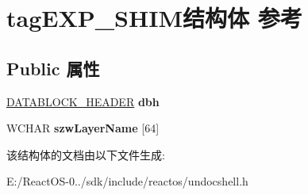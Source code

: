 \hypertarget{structtag_e_x_p___s_h_i_m}{}\section{tag\+E\+X\+P\+\_\+\+S\+H\+I\+M结构体 参考}
\label{structtag_e_x_p___s_h_i_m}
\subsection*{Public 属性}
\begin{DoxyCompactItemize}
\item 
\mbox{\label{structtag_e_x_p___s_h_i_m_add786a0cfe8d6192e657e947c8d99e6e}} 
\hyperlink{structtag_d_a_t_a_b_l_o_c_k_h_e_a_d_e_r}{D\+A\+T\+A\+B\+L\+O\+C\+K\+\_\+\+H\+E\+A\+D\+ER} {\bfseries dbh}
\item 
\mbox{\label{structtag_e_x_p___s_h_i_m_acbc229086193c16c507ed2f7d19516ea}} 
W\+C\+H\+AR {\bfseries szw\+Layer\+Name} \mbox{[}64\mbox{]}
\end{DoxyCompactItemize}


该结构体的文档由以下文件生成\+:\begin{DoxyCompactItemize}
\item 
E\+:/\+React\+O\+S-\/0../sdk/include/reactos/undocshell.\+h\end{DoxyCompactItemize}
